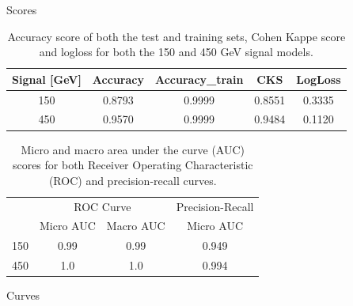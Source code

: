 \documentclass[notes]{beamer}
\begin{document}
	\begin{frame}[t]{Scores}
		\begin{table}[htb!]
			\centering
			\begin{tabular}{ |c|c|c|c|c| }
				\hline \rule{0pt}{13pt}
				Signal [GeV] & Accuracy & Accuracy\_train & CKS & LogLoss  \\
				\hline \rule{0pt}{13pt}
				150 & 0.8793 & 0.9999 & 0.8551 & 0.3335 \\
				\hline \rule{0pt}{13pt}
				450 & 0.9570 & 0.9999 & 0.9484 & 0.1120 \\
				\hline
			\end{tabular}	         
			\caption{Accuracy score of both the test and training sets, Cohen Kappe score and logloss for both the 150 and 450 GeV signal models.}
			\label{tab:Test}
		\end{table}
		\begin{table}[htb!]
			\centering
			\begin{tabular}{ |c|c|c|c| }
				\hline \rule{0pt}{13pt}
				\multirow{2}{*}{Signal [GeV]} & \multicolumn{2}{c|}{ROC Curve} & \multicolumn{1}{c|}{Precision-Recall}\\
				\cline{2-4} \rule{0pt}{13pt}
				 & Micro AUC & Macro AUC & Micro AUC  \\
				\hline \rule{0pt}{13pt}
				150 & 0.99 & 0.99 & 0.949 \\
				\hline \rule{0pt}{13pt}
				450 & 1.0 & 1.0 & 0.994  \\
				\hline
			\end{tabular}	         
			\caption{Micro and macro area under the curve (AUC) scores for both Receiver Operating Characteristic (ROC) and precision-recall curves.}
			\label{tab:AUC}
		\end{table}
	\end{frame}


	\begin{frame}[t]{Curves}
		\begin{figure}[h]
			\centering
			\\
			\centering
		\end{figure}
	\end{frame}
\end{document}
